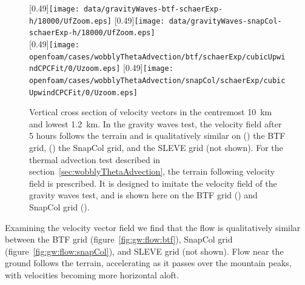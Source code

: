 \begin{figure}
	\captionsetup[subfigure]{position=b}
	\centering
	[0.49\textwidth]{\texttt{[image: data/gravityWaves-btf-schaerExp-h/18000/UfZoom.eps]}}
	[0.49\textwidth]{\texttt{[image: data/gravityWaves-snapCol-schaerExp-h/18000/UfZoom.eps]}} \\
%
	[0.49\textwidth]{\texttt{[image: openfoam/cases/wobblyThetaAdvection/btf/schaerExp/cubicUpwindCPCFit/0/Uzoom.eps]}}
	[0.49\textwidth]{\texttt{[image: openfoam/cases/wobblyThetaAdvection/snapCol/schaerExp/cubicUpwindCPCFit/0/Uzoom.eps]}} \\
%
	\caption{Vertical cross section of velocity vectors in the centremost \SI{10}{\kilo\meter} and lowest \SI{1.2}{\kilo\meter}.  In the gravity waves test, the velocity field after 5 hours follows the terrain and is qualitatively similar on () the BTF grid, () the SnapCol grid, and the SLEVE grid (not shown).  For the thermal advection test described in section~\ref{sec:wobblyThetaAdvection}, the terrain following velocity field is prescribed.  It is designed to imitate the velocity field of the gravity waves test, and is shown here on the BTF grid () and SnapCol grid ().}
	\label{fig:gw:flow}
\end{figure}

Examining the velocity vector field we find that the flow is qualitatively similar between the BTF grid (figure~\ref{fig:gw:flow:btf}), SnapCol grid (figure~\ref{fig:gw:flow:snapCol}), and SLEVE grid (not shown).  Flow near the ground follows the terrain, accelerating as it passes over the mountain peaks, with velocities becoming more horizontal aloft.  

